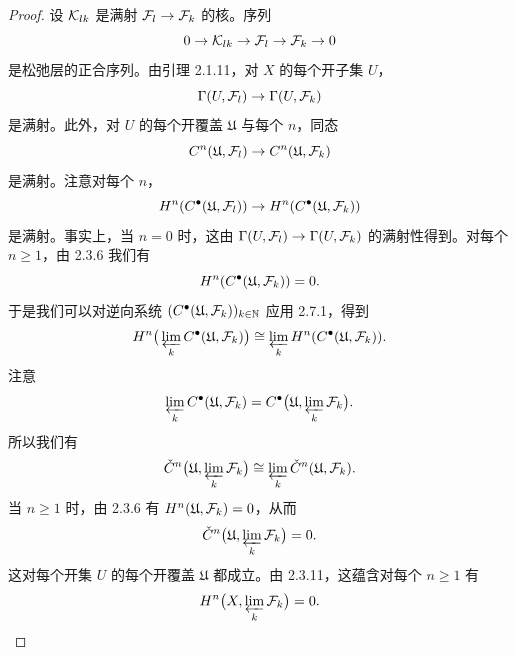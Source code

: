 \begin{proof}
设 $\mathcal{K}_{lk}$ 是满射 $\mathcal{F}_l\to\mathcal{F}_k$ 的核。序列
\begin{equation*}
0\to\mathcal{K}_{lk}\to\mathcal{F}_l\to\mathcal{F}_k\to 0
\end{equation*}
是松弛层的正合序列。由引理 2.1.11，对 $X$ 的每个开子集 $U$，
\begin{equation*}
\Gamma(U,\mathcal{F}_l)\to\Gamma(U,\mathcal{F}_k)
\end{equation*}
是满射。此外，对 $U$ 的每个开覆盖 $\mathfrak{U}$ 与每个 $n$，同态
\begin{equation*}
C^n(\mathfrak{U},\mathcal{F}_l)\to C^n(\mathfrak{U},\mathcal{F}_k)
\end{equation*}
是满射。注意对每个 $n$，
\begin{equation*}
H^n(C^{\bullet}(\mathfrak{U},\mathcal{F}_l))\to H^n(C^{\bullet}(\mathfrak{U},\mathcal{F}_k))
\end{equation*}
是满射。事实上，当 $n=0$ 时，这由 $\Gamma(U,\mathcal{F}_l)\to\Gamma(U,\mathcal{F}_k)$ 的满射性得到。对每个 $n\ge1$，由 2.3.6 我们有
\begin{equation*}
H^n(C^{\bullet}(\mathfrak{U},\mathcal{F}_k))=0.
\end{equation*}
于是我们可以对逆向系统 $(C^{\bullet}(\mathfrak{U},\mathcal{F}_k))_{k\in\mathbb{N}}$ 应用 2.7.1，得到
\begin{equation*}
H^n\big(\varprojlim_k C^{\bullet}(\mathfrak{U},\mathcal{F}_k)\big)\cong\varprojlim_k H^n(C^{\bullet}(\mathfrak{U},\mathcal{F}_k)).
\end{equation*}
注意
\begin{equation*}
\varprojlim_k C^{\bullet}(\mathfrak{U},\mathcal{F}_k)=C^{\bullet}\big(\mathfrak{U},\varprojlim_k\mathcal{F}_k\big).
\end{equation*}
所以我们有
\begin{equation*}
\check{C}^n\big(\mathfrak{U},\varprojlim_k\mathcal{F}_k\big)\cong\varprojlim_k\check{C}^n(\mathfrak{U},\mathcal{F}_k).
\end{equation*}
当 $n\ge1$ 时，由 2.3.6 有 $H^n(\mathfrak{U},\mathcal{F}_k)=0$，从而
\begin{equation*}
\check{C}^n\big(\mathfrak{U},\varprojlim_k\mathcal{F}_k\big)=0.
\end{equation*}
这对每个开集 $U$ 的每个开覆盖 $\mathfrak{U}$ 都成立。由 2.3.11，这蕴含对每个 $n\ge1$ 有
\begin{equation*}
H^n\big(X,\varprojlim_k\mathcal{F}_k\big)=0.
\end{equation*}
\end{proof}

